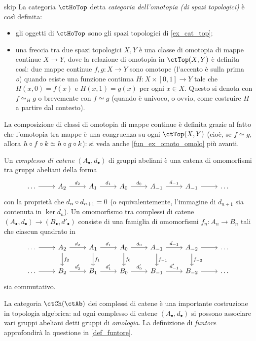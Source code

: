 \begin{hExample}{skip}\label{ex_cat_hotop}
	La categoria \(\ctHoTop\) detta \emph{categoria dell'omotopia (di spazi topologici)} è così definita:
	\begin{itemize}
		\item gli oggetti di \(\ctHoTop\) sono gli spazi topologici di \ref{ex_cat_top};
		\item una freccia tra due spazi topologici \(X,Y\) è una classe di omotopia di mappe continue \(X\to Y\), dove la relazione di omotopia in \(\ctTop(X,Y)\) è definita così: due mappe continue \(f,g : X\to Y\) sono omotope (l'accento è sulla prima \emph{o}) quando esiste una funzione continua \(H : X \times [0,1] \to Y\) tale che \(H(x,0) = f(x)\) e \(H(x,1)=g(x)\) per ogni \(x\in X\). Questo si denota con \(f\simeq_H g\) o brevemente con \(f\simeq g\) (quando è univoco, o ovvio, come costruire \(H\) a partire dal contesto).
	\end{itemize}
	La composizione di classi di omotopia di mappe continue è definita grazie al fatto che l'omotopia tra mappe è una congruenza su ogni \(\ctTop(X,Y)\) (cioè, se \(f\simeq g\), allora \(h\circ f\circ k\simeq h\circ g\circ k\)): si veda anche \ref{fun_ex_omoto_omolo} più avanti.
\end{hExample}
\begin{example}\label{ex_cat_chcomples}
	Un \emph{complesso di catene} \((A_\bullet, d_\bullet)\) di gruppi abeliani è una catena di omomorfismi tra gruppi abeliani della forma
	\[\begin{tikzcd}
			\dots \ar[r] & A_2 \ar[r, "d_2"] & A_1  \ar[r, "d_1"] & A_0 \ar[r, "d_0"] & A_{-1} \ar[r, "d_{-1}"] & A_{-1} \ar[r] & \dots
		\end{tikzcd}\]
	con la proprietà che \(d_n\circ d_{n+1}=0\) (o equivalentemente, l'immagine di \(d_{n+1}\) sia contenuta in \(\ker d_n\)). Un omomorfismo tra complessi di catene \((A_\bullet,d_\bullet) \to (B_\bullet,d'_\bullet)\) consiste di una famiglia di omomorfismi \(f_n : A_n \to B_n\) tali che ciascun quadrato in
	\[\begin{tikzcd}
			\dots \ar[r] & A_2 \ar[d,"f_2"]\ar[r, "d_2"] & A_1 \ar[d,"f_1"] \ar[r, "d_1"] & A_0 \ar[d,"f_0"]\ar[r, "d_0"] & A_{-1} \ar[d,"f_{-1}"]\ar[r, "d_{-1}"] & A_{-2} \ar[d, "f_{-2}"]\ar[r] & \dots\\
			\dots \ar[r] & B_2 \ar[r, "d_2'"] & B_1  \ar[r, "d_1'"] & B_0 \ar[r, "d_0'"] & B_{-1} \ar[r, "d_{-1}'"] & B_{-2} \ar[r] & \dots
		\end{tikzcd}\]
	sia commutativo.

	La categoria \(\ctCh(\ctAb)\) dei complessi di catene è una importante costruzione in topologia algebrica: ad ogni complesso di catene \((A_\bullet, d_\bullet)\) si possono associare vari gruppi abeliani detti gruppi di \emph{omologia}. La definizione di \emph{funtore} approfondirà la questione in \ref{def_funtore}.
\end{example}
